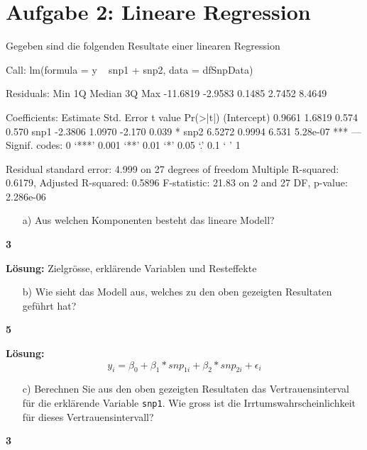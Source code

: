 \documentclass{scrartcl}
\newcommand{\points}[1]
{\begin{flushright}\textbf{#1}\end{flushright}}
\begin{document}
\clearpage
\pagebreak

\section*{Aufgabe 2: Lineare Regression}
Gegeben sind die folgenden Resultate einer linearen Regression
\begin{Schunk}
\begin{Soutput}
Call:
lm(formula = y ~ snp1 + snp2, data = dfSnpData)

Residuals:
     Min       1Q   Median       3Q      Max 
-11.6819  -2.9583   0.1485   2.7452   8.4649 

Coefficients:
            Estimate Std. Error t value Pr(>|t|)    
(Intercept)   0.9661     1.6819   0.574    0.570    
snp1         -2.3806     1.0970  -2.170    0.039 *  
snp2          6.5272     0.9994   6.531 5.28e-07 ***
---
Signif. codes:  0 ‘***’ 0.001 ‘**’ 0.01 ‘*’ 0.05 ‘.’ 0.1 ‘ ’ 1

Residual standard error: 4.999 on 27 degrees of freedom
Multiple R-squared:  0.6179,	Adjusted R-squared:  0.5896 
F-statistic: 21.83 on 2 and 27 DF,  p-value: 2.286e-06
\end{Soutput}
\end{Schunk}

\begin{enumerate}
\item[a)] Aus welchen Komponenten besteht das lineare Modell?
\end{enumerate}
\points{3}

\noindent\textbf{L\"osung:}
Zielgr\"osse, erkl\"arende Variablen und Resteffekte

\clearpage
\pagebreak

\begin{enumerate}
\item[b)] Wie sieht das Modell aus, welches zu den oben gezeigten Resultaten gef\"uhrt hat?
\end{enumerate}
\points{5}

\noindent\textbf{L\"osung:}
$$ y_i = \beta_0 + \beta_1*snp_{1i} + \beta_2*snp_{2i} + \epsilon_i$$

\clearpage
\pagebreak

\begin{enumerate}
\item[c)] Berechnen Sie aus den oben gezeigten Resultaten das Vertrauensinterval f\"ur die erkl\"arende Variable \verb+snp1+. Wie gross ist die Irrtumswahrscheinlichkeit f\"ur dieses Vertrauensintervall?
\end{enumerate}
\points{3}
\end{document}
